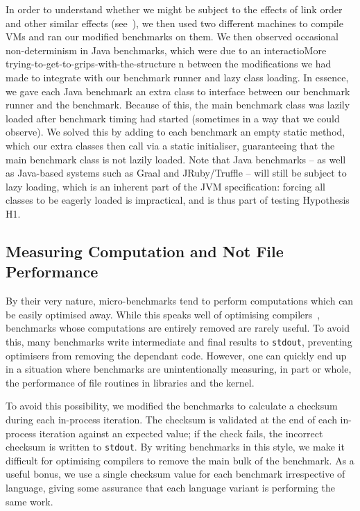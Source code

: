 \documentclass[preprint,numbers,10pt]{sigplanconf}
\begin{document}
In order to understand whether we might be subject to the effects of link
order and other similar effects (see~\cite{mytkowicz09surprising}),
we then used two different machines to compile VMs and ran our modified benchmarks
on them. We then observed occasional non-determinism in Java benchmarks,
which were due to an interactioMore trying-to-get-to-grips-with-the-structure
n between the modifications we had made to
integrate with our benchmark runner and lazy class loading. In essence,
we gave each Java benchmark an extra class to interface between our
benchmark runner and the benchmark. Because of this, the main benchmark class was lazily loaded after
benchmark timing had started (sometimes in a way that we could observe). We
solved this by adding to each benchmark an empty static method, which our
extra classes then call via a static initialiser, guaranteeing that
the main benchmark class is not lazily loaded. Note that Java
benchmarks -- as well as
Java-based systems such as Graal and JRuby/Truffle -- will still be subject to
lazy loading, which is an inherent part of the JVM specification: forcing all
classes to be eagerly loaded is impractical, and is thus part of testing
Hypothesis H1.


\subsection{Measuring Computation and Not File Performance}

By their very nature, micro-benchmarks tend to perform computations which
can be easily optimised away. While this speaks well of
optimising compilers~\cite{seaton15phd}, benchmarks whose computations
are entirely removed are rarely useful. To avoid this,
many benchmarks write intermediate and final results
to \texttt{stdout}, preventing optimisers from removing the dependant code.
However, one can quickly end up in a situation where benchmarks are
unintentionally measuring, in part or whole, the performance of file routines in
libraries and the kernel.

To avoid this possibility, we modified the benchmarks to calculate a checksum
during each in-process iteration.
The checksum is validated at the end of each in-process iteration against an expected
value; if the check fails, the incorrect checksum is written to \texttt{stdout}.
By writing benchmarks in
this style, we make it difficult for optimising compilers to remove the
main bulk of the benchmark. As a useful bonus, we use a single checksum value
for each benchmark irrespective of language, giving some assurance that each language variant is
performing the same work.
\end{document}
